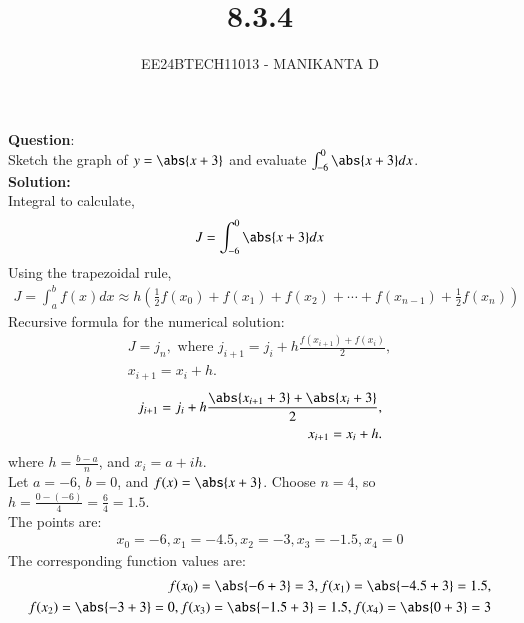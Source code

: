 \documentclass[journal]{IEEEtran}
\begin{document}

\vspace{3cm}

\title{8.3.4}
\author{EE24BTECH11013 - MANIKANTA D}
 \maketitle
{\let\newpage\relax\maketitle}

\renewcommand{\thefigure}{\theenumi}
\renewcommand{\thetable}{\theenumi}
\setlength{\intextsep}{10pt} %


\renewcommand{\thetable}{\theenumi}
\textbf{Question}:\\
Sketch the graph of $y = \abs{x + 3}$ and evaluate $\int_{-6}^{0} \abs{x + 3}dx$.
\\
\textbf{Solution: }\\
Integral to calculate, 
\begin{align}
    J = \int_{-6}^{0} \abs{x + 3}dx
\end{align}
Using the trapezoidal rule,
\begin{align}
    J = \int_a^b f(x)dx \approx h \left(\frac{1}{2}f(x_0) + f(x_1) + f(x_2) + \cdots + f(x_{n-1}) + \frac{1}{2}f(x_n)\right)
\end{align}
Recursive formula for the numerical solution:
\begin{align}
    J = j_n, \text{ where } j_{i+1} = j_i + h \frac{f(x_{i+1}) + f(x_i)}{2}, \\
    x_{i+1} = x_i + h.
\end{align}
\begin{align}
    j_{i+1} = j_i + h \frac{\abs{x_{i+1} + 3} + \abs{x_i + 3}}{2}, \\
    x_{i+1} = x_i + h.
\end{align}
where $h = \frac{b-a}{n}$, and $x_i = a + ih$.\\
Let $a = -6$, $b = 0$, and $f(x) = \abs{x + 3}$. Choose $n = 4$, so $h = \frac{0 - (-6)}{4} = \frac{6}{4} = 1.5$. \\The points are:
\begin{align}
    x_0 = -6, x_1 = -4.5, x_2 = -3, x_3 = -1.5, x_4 = 0
\end{align}
The corresponding function values are:
\begin{align}
    f(x_0) = \abs{-6 + 3} = 3, f(x_1) = \abs{-4.5 + 3} = 1.5, \\
    f(x_2) = \abs{-3 + 3} = 0, f(x_3) = \abs{-1.5 + 3} = 1.5, f(x_4) = \abs{0 + 3} = 3
\end{align}
\end{document}
